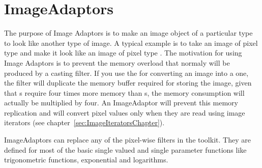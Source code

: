 
\chapter{ImageAdaptors}


The purpose of Image Adaptors is to make an image object of a particular type
to look like another type of image. A typical example is to take an image of
pixel type  and make it look like an image of pixel type
. The motivation for using Image Adaptors is to prevent the memory
overload that normaly will be produced by a casting filter. If you use the
 for converting an  image into a
 one, the filter will duplicate the memory buffer required for
storing the image, given that s require four times more memory than
s, the memory consumption will actually be multiplied by
four. An ImageAdaptor will prevent this memory replication and will convert
pixel values only when they are read using image iterators (see
chapter~\ref{sec:ImageIteratorsChapter}).

ImageAdaptors can replace any of the pixel-wise filters in the toolkit. They
are defined for most of the basic single valued and single parameter functions
like trigonometric functions, exponential and logarithms.

